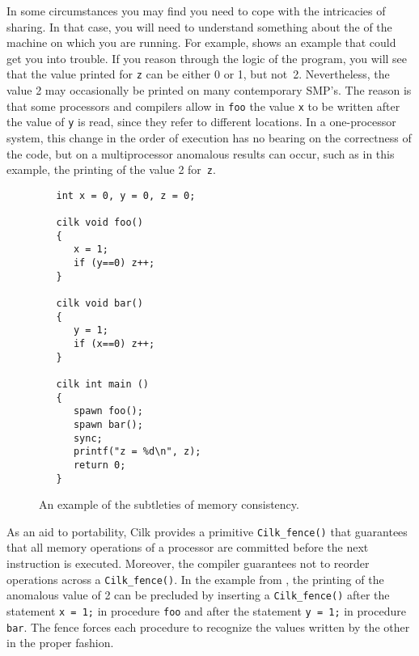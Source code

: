 In some circumstances you may find you need to cope with the
intricacies of sharing.  In that case, you will need to understand
something about the  of the machine on
which you are running.  For example,  shows an
example that could get you into trouble.  If you reason through the
logic of the program, you will see that the value printed for
\texttt{z} can be either 0 or 1, but not~2.  Nevertheless, the value 2
may occasionally be printed on many contemporary SMP's.  The reason is
that some processors and compilers allow in \texttt{foo} the value
\texttt{x} to be written after the value of \texttt{y} is read, since
they refer to different locations.  In a one-processor system, this
change in the order of execution has no bearing on the correctness of
the code, but on a multiprocessor anomalous results can occur, such as
in this example, the printing of the value 2 for~\texttt{z}.

\begin{figure}
\begin{center}
\begin{minipage}{11cm}
\begin{verbatim}
   int x = 0, y = 0, z = 0;

   cilk void foo()
   {
      x = 1;
      if (y==0) z++;
   }

   cilk void bar()
   {
      y = 1;
      if (x==0) z++;
   }

   cilk int main ()
   {
      spawn foo();
      spawn bar();
      sync;
      printf("z = %d\n", z);
      return 0;
   }
\end{verbatim}
\end{minipage}
\end{center}
\caption{\small An example of the subtleties of memory consistency.}
\label{fig:Dijkstra}
\end{figure}

 As
an aid to portability, Cilk provides a primitive
\texttt{Cilk\_fence()} that guarantees that all memory operations of a
processor are committed before the next instruction is executed.
Moreover, the compiler guarantees not to reorder operations across a
\texttt{Cilk\_fence()}.  In the example from , the
printing of the anomalous value of 2 can be precluded by inserting a
\texttt{Cilk\_fence()} after the statement \texttt{x = 1;} in
procedure \texttt{foo} and after the statement \texttt{y = 1;} in
procedure \texttt{bar}.  The fence forces each procedure to recognize
the values written by the other in the proper fashion.

